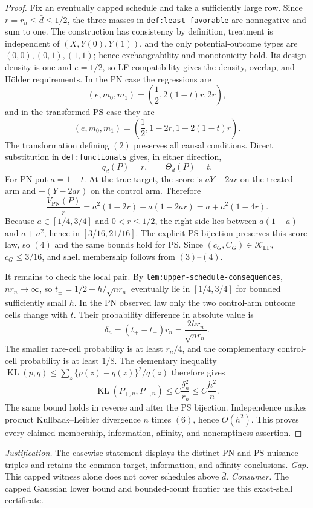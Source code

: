 \documentclass{article}
\begin{document}
\begin{proof}
Fix an eventually capped schedule and take a sufficiently large row. Since \(r=r_n\le\bar d\le1/2\), the three masses in \texttt{def:least-favorable} are nonnegative and sum to one. The construction has consistency by definition, treatment is independent of \((X,Y(0),Y(1))\), and the only potential-outcome types are \((0,0),(0,1),(1,1)\); hence exchangeability and monotonicity hold. Its design density is one and \(e=1/2\), so LF compatibility gives the density, overlap, and H\"older requirements. In the PN case the regressions are
\[(e,m_0,m_1)=\left(\frac12,2(1-t)r,2r\right),\tag{1}\]
and in the transformed PS case they are
\[(e,m_0,m_1)=\left(\frac12,1-2r,1-2(1-t)r\right).\tag{2}\]
The transformation defining \((2)\) preserves all causal conditions. Direct substitution in \texttt{def:functionals} gives, in either direction,
\[q_d(P)=r,\qquad \Theta_d(P)=t.\tag{3}\]
For PN put \(a=1-t\). At the true target, the score is \(aY-2ar\) on the treated arm and \(-(Y-2ar)\) on the control arm. Therefore
\[\frac{V_{\mathrm{PN}}(P)}r=a^2(1-2r)+a(1-2ar)=a+a^2(1-4r).\tag{4}\]
Because \(a\in[1/4,3/4]\) and \(0<r\le1/2\), the right side lies between \(a(1-a)\) and \(a+a^2\), hence in \([3/16,21/16]\). The explicit PS bijection preserves this score law, so \((4)\) and the same bounds hold for PS. Since \((c_G,C_G)\in\mathcal K_{\mathrm{LF}}\), \(c_G\le3/16\), and shell membership follows from \((3)\)--\((4)\).

It remains to check the local pair. By \texttt{lem:upper-schedule-consequences}, \(nr_n\to\infty\), so \(t_\pm=1/2\pm h/\sqrt{nr_n}\) eventually lie in \([1/4,3/4]\) for bounded sufficiently small \(h\). In the PN observed law only the two control-arm outcome cells change with \(t\). Their probability difference in absolute value is
\[\delta_n=(t_+-t_-)r_n=\frac{2hr_n}{\sqrt{nr_n}}.\tag{5}\]
The smaller rare-cell probability is at least \(r_n/4\), and the complementary control-cell probability is at least \(1/8\). The elementary inequality \(\operatorname{KL}(p,q)\le\sum_z\{p(z)-q(z)\}^2/q(z)\) therefore gives
\[\operatorname{KL}(P_{+,n},P_{-,n})\le C\frac{\delta_n^2}{r_n}\le C\frac{h^2}{n}.\tag{6}\]
The same bound holds in reverse and after the PS bijection. Independence makes product Kullback--Leibler divergence \(n\) times \((6)\), hence \(O(h^2)\). This proves every claimed membership, information, affinity, and nonemptiness assertion.
\end{proof}
\par\smallskip\noindent \textit{Justification.} The casewise statement displays the distinct PN and PS nuisance triples and retains the common target, information, and affinity conclusions. \textit{Gap.} This capped witness alone does not cover schedules above \(\bar d\). \textit{Consumer.} The capped Gaussian lower bound and bounded-count frontier use this exact-shell certificate.
\end{document}
